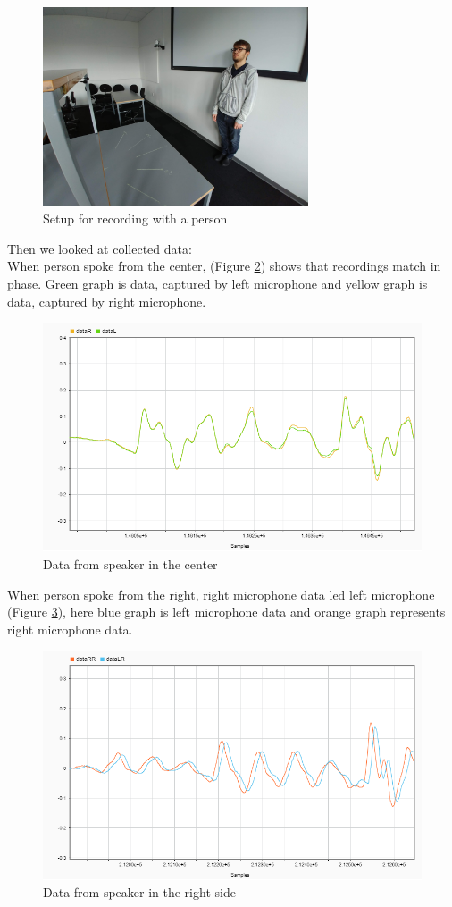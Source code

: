 \begin{figure}[htp]
	\centering
	\includegraphics[width=0.7\textwidth]{Illustrations/razvanWithSetup.jpg}
	\caption{Setup for recording with a person}
	\label{fig:RanzvanRecSetup}
\end{figure}

Then we looked at collected data:\\
When person spoke from the center, (Figure \ref{fig:C}) shows that recordings match in phase. Green graph is 
data, captured by left microphone and yellow graph is data, captured by right microphone.
\begin{figure}[htp]
  \centering
  \includegraphics[width=0.75\linewidth]{Illustrations/DataC.png}
  \caption{Data from speaker in the center}
  \label{fig:C}
\end{figure}

When person spoke from the right, right microphone data led left microphone (Figure \ref{fig:R}), here blue graph is left microphone data and orange graph represents right microphone data.\\
\begin{figure}[htp]
  \centering
  \includegraphics[width=0.75\linewidth]{Illustrations/DataR.png}
  \caption{Data from speaker in the right side}
  \label{fig:R}
\end{figure}


